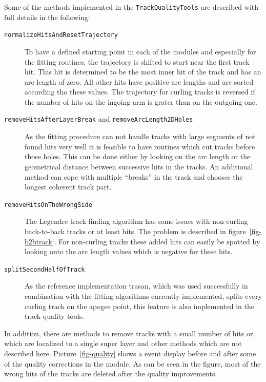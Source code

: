 Some of the methods implemented in the \texttt{TrackQualityTools} are described with full details in the following:
\begin{description}
 \item[\texttt{normalizeHitsAndResetTrajectory}] To have a defined starting point in each of the modules and especially for the fitting routines, the trajectory is shifted to start near the first track hit. This hit is determined to be the most inner hit of the track and has an arc length of zero. All other hits have positive arc lengths and are sorted according tho these values. The trajectory for curling tracks is reversed if the number of hits on the ingoing arm is grater than on the outgoing one.
 \item[\texttt{removeHitsAfterLayerBreak} and \texttt{removeArcLength2DHoles}]  As the fitting procedure can not handle tracks with large segments of not found hits very well it is feasible to have routines which cut tracks before those holes. This can be done either by looking on the arc length or the geometrical distance between successive hits in the tracks. An additional method can cope with multiple ``breaks'' in the track and chooses the longest coherent track part.
 \item[\texttt{removeHitsOnTheWrongSide}] The Legendre track finding algorithm has some issues with non-curling back-to-back tracks or at least hits. The problem is described in figure~\ref{fig-b2btrack}. For non-curling tracks these added hits can easily be spotted by looking onto the arc length values which is negative for these hits.
 \item[\texttt{splitSecondHalfOfTrack}] As the reference implementation trasan, which was used successfully in combination with the fitting algorithms currently implemented, splits every curling track on the apogee point, this feature is also implemented in the track quality tools.
\end{description}
In addition, there are methods to remove tracks with a small number of hits or which are localized to a single super layer and other methods which are not described here. Picture~\ref{fig-quality} shows a event display before and after some of the quality corrections in the module. As can be seen in the figure, most of the wrong hits of the tracks are deleted after the quality improvements. 

